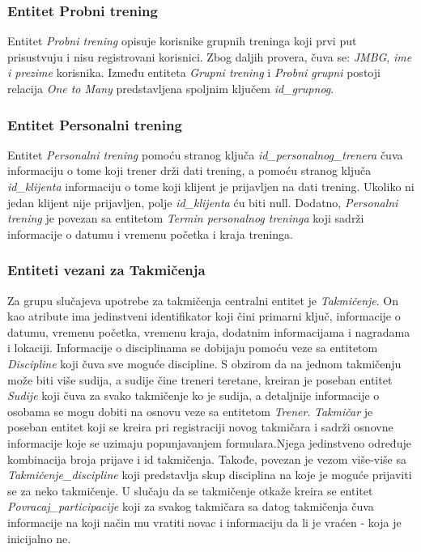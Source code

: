 \documentclass[../main.tex]{subfiles}
\begin{document}
\subsubsection{Entitet Probni trening}

Entitet \textit{Probni trening} opisuje korisnike grupnih treninga koji prvi put prisustvuju i nisu registrovani korisnici. Zbog daljih provera, čuva se:  \textit{JMBG},  \textit{ime i prezime} korisnika. Između entiteta \textit{Grupni trening} i \textit{Probni grupni} postoji relacija  \textit{One to Many} predstavljena spoljnim ključem  \textit{id\_grupnog}.

\subsubsection{Entitet Personalni trening}

Entitet \textit{Personalni trening} pomoću stranog ključa  \textit{id\_personalnog\_trenera}  čuva informaciju o tome koji trener drži dati trening, a pomoću stranog ključa  \textit{id\_klijenta} informaciju o tome koji klijent je prijavljen na dati trening. Ukoliko ni jedan klijent nije prijavljen, polje  \textit{id\_klijenta} ću biti null. Dodatno, \textit{Personalni trening} je povezan sa entitetom \textit{Termin personalnog treninga} koji sadrži informacije o datumu i vremenu početka i kraja treninga. 


\subsubsection{Entiteti vezani za Takmičenja}

Za grupu slučajeva upotrebe za takmičenja centralni entitet je \textit{Takmičenje}. On kao atribute ima jedinstveni identifikator koji čini primarni ključ, informacije o datumu, vremenu početka, vremenu kraja, dodatnim informacijama i nagradama i lokaciji. Informacije o disciplinama se dobijaju pomoću veze sa entitetom \textit{Discipline} koji čuva sve moguće discipline. S obzirom da na jednom takmičenju može biti više sudija, a sudije čine treneri teretane, kreiran je poseban entitet \textit{Sudije} koji čuva za svako takmičenje ko je sudija, a detaljnije informacije o osobama se mogu dobiti na osnovu veze sa entitetom \textit{Trener}. \textit{Takmičar} je poseban entitet koji se kreira pri registraciji novog takmičara i sadrži osnovne informacije koje se uzimaju popunjavanjem formulara.Njega jedinstveno određuje kombinacija broja prijave i id takmičenja. Takođe, povezan je vezom više-više sa \textit{Takmičenje\_discipline} koji predstavlja skup disciplina na koje je moguće prijaviti se za neko takmičenje. U slučaju da se takmičenje otkaže kreira se entitet \textit{Povracaj\_participacije} koji za svakog takmičara sa datog takmičenja čuva informacije na koji način mu vratiti novac i informaciju da li je vraćen - koja je inicijalno ne. 
\end{document}
